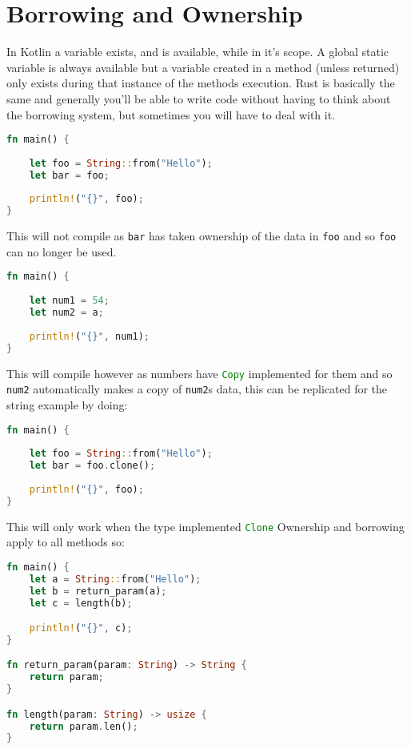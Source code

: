\documentclass[a4paper,11pt]{article}
\begin{document}
\newpage
\section{Borrowing and Ownership}
In Kotlin a variable exists, and is available, while in it's scope. A global static variable is always available but a variable created in a method (unless returned) only exists during that instance of the methods execution. Rust is basically the same and generally you'll be able to write code without having to think about the borrowing system, but sometimes you will have to deal with it.
\begin{lstlisting}[language=Rust,frame=single,backgroundcolor=\color{palered}]
fn main() {
    
    let foo = String::from("Hello");
    let bar = foo;
    
    println!("{}", foo);
}
\end{lstlisting}

This will not compile as \lstinline{bar} has taken ownership of the data in \lstinline{foo} and so \lstinline{foo} can no longer be used.

\begin{lstlisting}[language=Rust,frame=single]
fn main() {
    
    let num1 = 54;
    let num2 = a;
    
    println!("{}", num1);
}
\end{lstlisting}

This will compile however as numbers have \lstinline[language=Rust]{Copy} implemented for them and so \lstinline{num2} automatically makes a copy of \lstinline{num2}s data, this can be replicated for the string example by doing:

\begin{lstlisting}[language=Rust,frame=single]
fn main() {
    
    let foo = String::from("Hello");
    let bar = foo.clone();
    
    println!("{}", foo);
}
\end{lstlisting}
This will only work when the type implemented \lstinline[language=Rust]{Clone}
\newpage
Ownership and borrowing apply to all methods so:

\begin{lstlisting}[language=Rust,frame=single]
fn main() {
    let a = String::from("Hello");
    let b = return_param(a);
    let c = length(b);

    println!("{}", c);
}

fn return_param(param: String) -> String {
	return param;
}

fn length(param: String) -> usize {
	return param.len();
}
\end{lstlisting}
\end{document}
